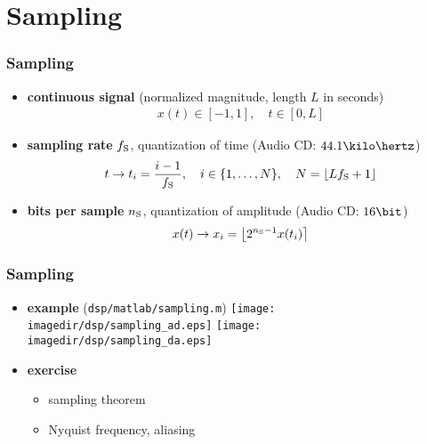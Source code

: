 
\section{Sampling}

\begin{frame}
	\frametitle{Sampling}
	\begin{itemize}
		\item \textbf{continuous signal} (normalized magnitude, length $L$ in seconds)
			\begin{align*}
				x(t)\in[-1,1],\quad t\in[0,L]
			\end{align*}
		\item \textbf{sampling rate} $f_{\textrm S}$, quantization of time (Audio CD: $44.1\kilo\hertz$)
			\begin{align*}
				t\rightarrow t_i=\frac{i-1}{f_{\textrm S}},\quad i\in\{1,\ldots,N\},\quad N=\lfloor Lf_{\textrm S}+1\rfloor
			\end{align*}
		\item \textbf{bits per sample} $n_{\textrm S}$, quantization of amplitude (Audio CD: $16\bit$)
			\begin{align*}
				x(t)\rightarrow x_i=\left\lfloor2^{n_{\textrm S}-1}x(t_i)\right\rceil
			\end{align*}
	\end{itemize}
\end{frame}

\begin{frame}
	\frametitle{Sampling}
	\begin{itemize}
		\item \textbf{example} (\texttt{dsp/matlab/sampling.m})
			\texttt{[image: \\imagedir/dsp/sampling\_ad.eps]}
			\texttt{[image: \\imagedir/dsp/sampling\_da.eps]}
		\item \textbf{exercise}
			\begin{itemize}
				\item sampling theorem
				\item Nyquist frequency, aliasing
			\end{itemize}
	\end{itemize}
\end{frame}

